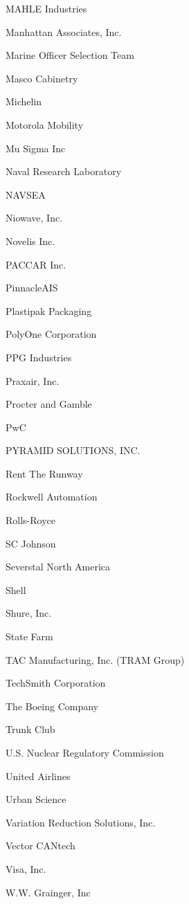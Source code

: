 \documentclass[twoside]{article}
\begin{document}
\begin{center}
\begin{multicols}{5}
\begin{FlushLeft}
\begin{compactitem}
\item MAHLE Industries
\item Manhattan Associates, Inc.
\item Marine Officer Selection Team
\item Masco Cabinetry
\item Michelin
\item Motorola Mobility
\item Mu Sigma Inc
\item Naval Research Laboratory
\item NAVSEA
\item Niowave, Inc.
\item Novelis Inc.
\item PACCAR Inc.
\item PinnacleAIS
\item Plastipak Packaging
\item PolyOne Corporation
\item PPG Industries
\item Praxair, Inc.
\item Procter and Gamble
\item PwC
\item PYRAMID SOLUTIONS, INC.
\item Rent The Runway
\item Rockwell Automation
\item Rolls-Royce
\item SC Johnson
\item Severstal North America
\item Shell
\item Shure, Inc.
\item State Farm
\item TAC Manufacturing, Inc. (TRAM Group)
\item TechSmith Corporation
\item The Boeing Company
\item Trunk Club
\item U.S. Nuclear Regulatory Commission
\item United Airlines
\item Urban Science
\item Variation Reduction Solutions, Inc.
\item Vector CANtech
\item Visa, Inc.
\item W.W. Grainger, Inc
\end{compactitem}
        \end{FlushLeft}
        \vspace{1em}

\end{multicols}
\end{center}
\end{document}
